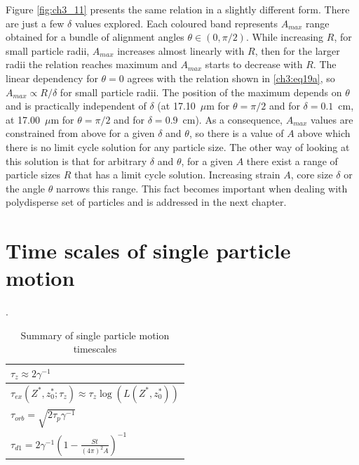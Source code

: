 \documentclass[../main.tex]{subfiles}
\begin{document}
Figure \ref{fig:ch3_11} presents the same relation in a slightly different form. There are just a few $\delta$ values explored. Each coloured band represents $A_{max}$ range obtained for a bundle of alignment angles $\theta \in (0,\pi/2)$. While increasing $R$, for small particle radii, $A_{max}$ increases almost linearly with $R$, then for the larger radii the relation reaches maximum and $A_{max}$ starts to decrease with $R$. The linear dependency for $\theta=0$ agrees with the relation shown in \ref{ch3:eq19a}, so $A_{max} \propto R/\delta$ for small particle radii. The position of the maximum depends on $\theta$ and is practically independent of $\delta$ (at 17.10~$\mu$m for $\theta=\pi/2$ and for $\delta=0.1$~cm, at 17.00~$\mu$m for $\theta=\pi/2$ and for $\delta=0.9$~cm). As a consequence, $A_{max}$ values are constrained from above for a given $\delta$ and $\theta$, so there is a value of $A$ above which there is no limit cycle solution for any particle size. The other way of looking at this solution is that for arbitrary $\delta$ and $\theta$, for a given $A$ there exist a range of particle sizes $R$ that has a limit cycle solution. Increasing strain $A$, core size $\delta$ or the angle $\theta$ narrows this range. This fact becomes important when dealing with polydisperse set of particles and is addressed in the next chapter.\\

\section{Time scales of single particle motion}

\begin{table}
\small
\tabcolsep=0.2cm
\caption{Summary of single particle motion timescales}.
\centering
\begin{tabular}{|l|}
\hline 
$\tau_z\approx 2\gamma^{-1}$\\
\hline 
$\tau_{ex}(Z^\ast,z_0^\ast; \tau_z)\approx \tau_z \log\left(L(Z^\ast,z_0^\ast)\right)$\\
\hline 
$\tau_{orb}=\sqrt{2 \tau_p \gamma^{-1}}$\\
\hline
$\tau_{d1} =2 \gamma^{-1} \left(1-\frac{St}{(4\pi)^{2} A}\right)^{-1}$\\
\hline
\end{tabular}
\label{tab:ch3_5}
\end{table}
\end{document}
